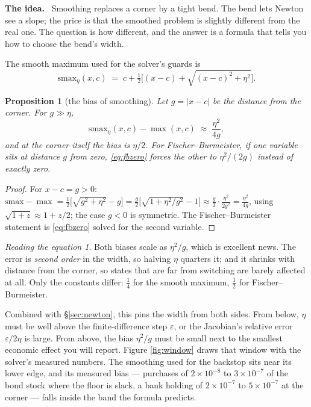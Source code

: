 \documentclass[10pt,a4paper]{article}
\newenvironment{idea}{\begin{shaded}\noindent\textbf{The idea.}\ }{\end{shaded}}
\theoremstyle{plain}
\newtheorem{prop}[thm]{Proposition}
\theoremstyle{remark}
\newtheorem*{reading}{Reading the equation}
\begin{document}
\begin{idea}
Smoothing replaces a corner by a tight bend. The bend lets Newton see a slope; the price is that
the smoothed problem is slightly different from the real one. The question is how different, and
the answer is a formula that tells you how to choose the bend's width.
\end{idea}

\noindent The smooth maximum used for the solver's guards is
\begin{equation}
  \mathrm{smax}_\eta(x,c) \;=\; c + \tfrac12\Big[(x-c) + \sqrt{(x-c)^2+\eta^2}\Big].
  \label{eq:smax}
\end{equation}

\begin{prop}[the bias of smoothing]
\label{prop:bias}
Let $g=|x-c|$ be the distance from the corner. For $g\gg\eta$,
\begin{equation}
  \mathrm{smax}_\eta(x,c)-\max(x,c) \;\approx\; \frac{\eta^2}{4g},
\end{equation}
and at the corner itself the bias is $\eta/2$. For Fischer--Burmeister, if one variable sits at
distance $g$ from zero, \eqref{eq:fbzero} forces the other to $\eta^2/(2g)$ instead of exactly
zero.
\end{prop}

\begin{proof}
For $x-c=g>0$: $\mathrm{smax}-\max = \tfrac12\big[\sqrt{g^2+\eta^2}-g\big] =
\tfrac g2\big[\sqrt{1+\eta^2/g^2}-1\big] \approx \tfrac g2\cdot\tfrac{\eta^2}{2g^2} = \tfrac{\eta^2}{4g}$,
using $\sqrt{1+z}\approx1+z/2$; the case $g<0$ is symmetric. The Fischer--Burmeister statement is
\eqref{eq:fbzero} solved for the second variable.
\end{proof}

\begin{reading}
Both biases scale as $\eta^2/g$, which is excellent news. The error is \emph{second order} in the
width, so halving $\eta$ quarters it; and it shrinks with distance from the corner, so states that
are far from switching are barely affected at all. Only the constants differ: $\tfrac14$ for the
smooth maximum, $\tfrac12$ for Fischer--Burmeister.
\end{reading}

\noindent Combined with \S\ref{sec:newton}, this pins the width from both sides. From below,
$\eta$ must be well above the finite-difference step $\varepsilon$, or the Jacobian's relative
error $\varepsilon/2\eta$ is large. From above, the bias $\eta^2/g$ must be small next to the
smallest economic effect you will report. Figure \ref{fig:window} draws that window with the
solver's measured numbers. The smoothing used for the backstop sits near its lower edge, and its
measured bias --- purchases of $2\times10^{-8}$ to $3\times10^{-7}$ of the bond stock where the
floor is slack, a bank holding of $2\times10^{-7}$ to $5\times10^{-7}$ at the corner --- falls
inside the band the formula predicts.
\end{document}
